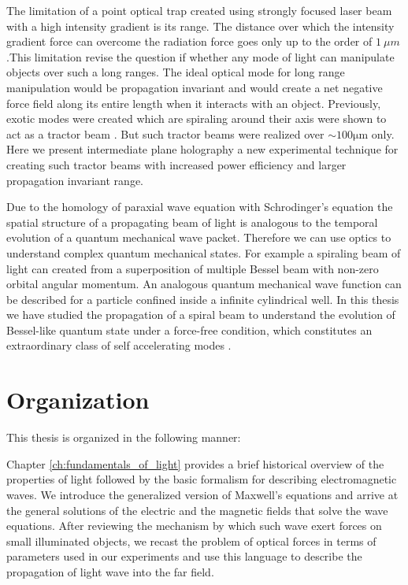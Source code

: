 The limitation of a point optical trap created using strongly focused laser beam with a high intensity gradient is its range. The distance over which the intensity gradient force can overcome the radiation force goes only up to the order of $\SI{1}{\mu m}$.This limitation revise the question if whether any mode of light  can manipulate objects over such a long ranges. The ideal optical mode for long range manipulation would be propagation invariant  and would create a net negative force field along its entire length when it interacts with an object. Previously, exotic modes were created which are spiraling around their axis were shown to act as a tractor beam \cite{Lee_2010}. But such tractor beams were realized over $\sim 100 \mathrm{\mu m}$ only. Here we present intermediate plane holography a new experimental technique for creating such tractor beams with increased power efficiency and larger propagation invariant range.


Due to the homology of paraxial wave equation with Schrodinger's equation the spatial structure of a propagating beam of light is analogous to the temporal evolution of a quantum mechanical wave packet. Therefore we can use optics to understand complex quantum mechanical states. For example a spiraling beam of light can created from a superposition of multiple Bessel beam with non-zero orbital angular momentum. An analogous quantum mechanical wave function can be described for a particle confined inside a infinite cylindrical well. In this thesis we have studied the propagation of a spiral beam to understand the evolution of  Bessel-like quantum state under a force-free condition, which constitutes an extraordinary class of self accelerating modes \cite{Berry1979}.



\section{Organization}

This thesis is organized in the following manner:

Chapter \ref{ch:fundamentals_of_light} provides a brief historical overview of the properties of light followed by the basic formalism for describing electromagnetic waves. We introduce the generalized version of Maxwell's equations and arrive at the general solutions of the electric and the magnetic fields that solve the wave equations. After reviewing the mechanism by which such wave exert forces on small illuminated objects, we recast the problem of optical forces in terms of parameters used in our experiments and use this language to describe the propagation of light wave into the far field. 

